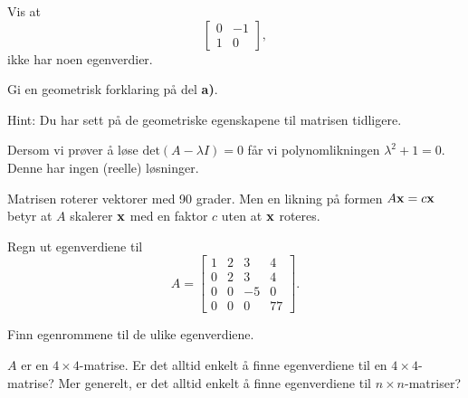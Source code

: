 \begin{oppgave}

\begin{punkt}
Vis at $$\begin{bmatrix}
0 & -1\\
1 & 0
\end{bmatrix},
$$ ikke har noen egenverdier.

\end{punkt}

\begin{punkt}
Gi en geometrisk forklaring på del \textbf{a)}.

\noindent
Hint: Du har sett på de geometriske egenskapene til matrisen tidligere.
\end{punkt}

\end{oppgave}


\begin{losning}

\begin{punkt}
Dersom vi prøver å løse $\text{det}(A-\lambda I)=0$ får vi polynomlikningen $\lambda^2+1=0$. Denne har ingen (reelle) løsninger.
\end{punkt}

\begin{punkt}
Matrisen roterer vektorer med 90 grader. Men en likning på formen $A\mathbf{x}=c\mathbf{x}$ betyr at $A$ skalerer $\mathbf{x}$ med en faktor $c$ uten at $\mathbf{x}$ roteres.
\end{punkt}

\end{losning}


\begin{oppgave}
\begin{punkt}
Regn ut egenverdiene til $$A=\begin{bmatrix}
1 & 2 & 3 & 4\\
0 & 2 & 3 & 4\\
0 & 0 & -5 & 0\\
0 & 0 & 0 & 77
\end{bmatrix}.
$$

\end{punkt}

\begin{punkt}
Finn egenrommene til de ulike egenverdiene.
\end{punkt}

\begin{punkt}
$A$ er en $4\times 4$-matrise. Er det alltid enkelt å finne egenverdiene til en $4\times 4$-matrise? Mer generelt, er det alltid enkelt å finne egenverdiene til $n\times n$-matriser?
\end{punkt}

\end{oppgave}


